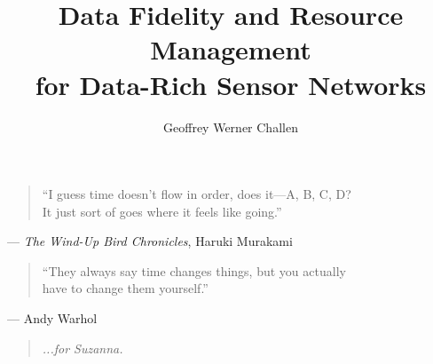 
\title{Data Fidelity and Resource Management\\for Data-Rich Sensor Networks}
\author{Geoffrey Werner Challen}

\maketitle
\copyrightpage



\begin{abstract}

\end{abstract}


{\ssp
\epigram
\vspace*{50pt}
\begin{quote} 
``I guess time doesn't flow in order, does it---A, B, C, D?\\It just sort of
goes where it feels like going.''
\end{quote}
\hfill--- \textit{The Wind-Up Bird Chronicles}, Haruki Murakami
\vspace*{0.5in}
\begin{quote} 
``They always say time changes things, but you actually\\have to change them
yourself.''
\end{quote}
\hfill--- Andy Warhol}
\newpage


{\ssp
{}
\tableofcontents
\newpage
\listoffigures
\listoftables}



\begin{acknowledgments}

\end{acknowledgments}


{\ssp
\dedication
\vspace*{50pt}
\begin{quote}
\hfill \textit{...for Suzanna.}
\end{quote}}
\newpage


\startarabicpagination


